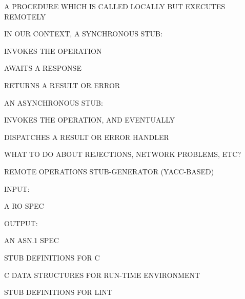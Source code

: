 \begin{bwslide}

\begin{nrtc}
\item	A PROCEDURE WHICH IS CALLED LOCALLY BUT EXECUTES REMOTELY

\item	IN OUR CONTEXT, A SYNCHRONOUS STUB:
    \begin{nrtc}
    \item	INVOKES THE OPERATION

    \item	AWAITS A RESPONSE

    \item	RETURNS A RESULT OR ERROR
    \end{nrtc}

\item	AN ASYNCHRONOUS STUB:
    \begin{nrtc}
    \item	INVOKES THE OPERATION, AND EVENTUALLY

    \item	DISPATCHES A RESULT OR ERROR HANDLER
    \end{nrtc}

\item	WHAT TO DO ABOUT REJECTIONS, NETWORK PROBLEMS, ETC?
\end{nrtc}
\end{bwslide}


\begin{bwslide}

\begin{nrtc}
\item	REMOTE OPERATIONS STUB-GENERATOR (YACC-BASED)

\item	INPUT:
    \begin{nrtc}
    \item	A RO SPEC
    \end{nrtc}

\item	OUTPUT:
    \begin{nrtc}
    \item	AN ASN.1 SPEC

    \item	STUB DEFINITIONS FOR C

    \item	C DATA STRUCTURES FOR RUN-TIME ENVIRONMENT

    \item	STUB DEFINITIONS FOR LINT
    \end{nrtc}
\end{nrtc}
\end{bwslide}


